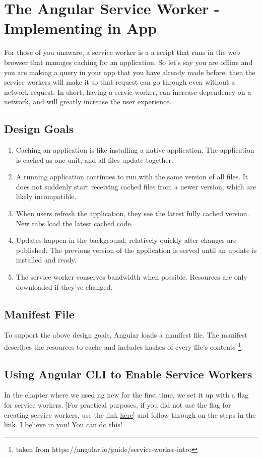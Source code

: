 \chapter{ The Angular Service Worker - Implementing in App }

For those of you unaware, a service worker is a a script that runs in the web
browser that manages caching for an application. So let's say you are offline
and you are making a query in your app that you have already made before, then
the service workers will make it so that request can go through even without a
network request. In short, having a servie worker, can increase dependency on a
network, and will greatly increase the user experience.

\section{ Design Goals }
\begin{enumerate}
  \item Caching an application is like installing a native application.
  The application is cached as one unit, and all files update together.
  \item A running application continues to run with the same version of all
  files. It does not suddenly start receiving cached files from a newer version,
  which are likely incompatible.
  \item When users refresh the application, they see the latest fully cached
  version. New tabs load the latest cached code.
  \item Updates happen in the background, relatively quickly after changes are
  published. The previous version of the application is served until an update
  is installed and ready.
  \item The service worker conserves bandwidth when possible. Resources are only
  downloaded if they've changed.
\end{enumerate}

\section{ Manifest File }
To support the above design goals, Angular loads a manifest file. The manifest
describes the resources to cache and includes hashes of every file's contents
\footnote{taken from https://angular.io/guide/service-worker-intro}.

\section{ Using Angular CLI to Enable Service Workers }
In the chapter where we used ng new for the first time, we set it up with a flag
for service workers. [For practical purposes, if you did not use the flag for
creating service workers, use the link \href{https://angular.io/guide/service-worker-getting-started}{here}]
and follow through on the steps in the link. I believe in you! You can do this!

